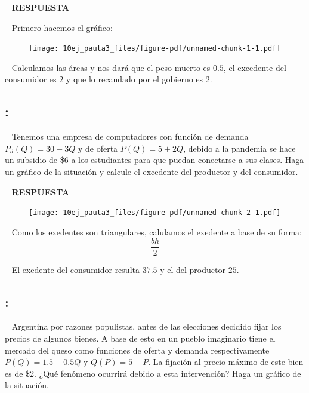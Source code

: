 \documentclass[
  letterpaper,
  DIV=11,
  numbers=noendperiod]{scrreport}
\begin{document}
~ \textbf{RESPUESTA}

~ Primero hacemos el gráfico:

\begin{figure}

{\centering \texttt{[image: 10ej\_pauta3\_files/figure-pdf/unnamed-chunk-1-1.pdf]}

}

\end{figure}

~ Calculamos las áreas y nos dará que el peso muerto es \(0.5\), el
excedente del consumidor es \(2\) y que lo recaudado por el gobierno es
\(2\).

\hypertarget{section-30}{%
\subsection{:}\label{section-30}}

~ Tenemos una empresa de computadores con función de demanda
\(P_d(Q)=30-3Q\) y de oferta \(P(Q)=5+2Q\), debido a la pandemia se hace
un subsidio de \$6 a los estudiantes para que puedan conectarse a sus
clases. Haga un gráfico de la situación y calcule el excedente del
productor y del consumidor.

~ \textbf{RESPUESTA}

\begin{figure}

{\centering \texttt{[image: 10ej\_pauta3\_files/figure-pdf/unnamed-chunk-2-1.pdf]}

}

\end{figure}

~ Como los exedentes son triangulares, calulamos el exedente a base de
su forma: \[
\frac{bh}{2}
\]

~ El exedente del consumidor resulta \(37.5\) y el del productor \(25\).

\hypertarget{section-31}{%
\subsection{:}\label{section-31}}

~ Argentina por razones populistas, antes de las elecciones decidido
fijar los precios de algunos bienes. A base de esto en un pueblo
imaginario tiene el mercado del queso como funciones de oferta y demanda
respectivamente \(P(Q)=1.5+0.5Q\) y \(Q(P)=5-P\). La fijación al precio
máximo de este bien es de \$2. ¿Qué fenómeno ocurrirá debido a esta
intervención? Haga un gráfico de la situación.
\end{document}
